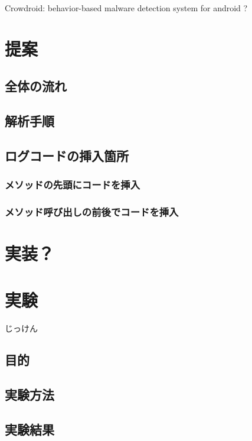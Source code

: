 \documentclass[12pt]{jsarticle}
\begin{document}
Crowdroid: behavior-based malware detection system for android ?

\newpage
\section{提案}

\subsection{全体の流れ}

\subsection{解析手順}

\subsection{ログコードの挿入箇所}

\subsubsection{メソッドの先頭にコードを挿入}
 
\subsubsection{メソッド呼び出しの前後でコードを挿入}
 
\newpage
\section{実装？}

\newpage
\section{実験}
\label{sec:exp}
じっけん
\subsection{目的}

\subsection{実験方法}

\subsection{実験結果}
\end{document}
